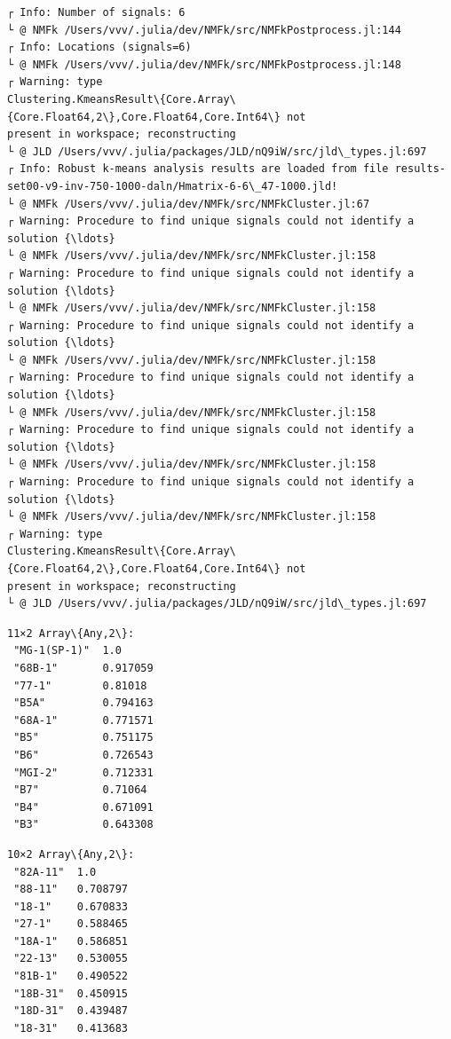 \documentclass[11pt]{article}
\begin{document}
    \begin{Verbatim}[commandchars=\\\{\}]
┌ Info: Number of signals: 6
└ @ NMFk /Users/vvv/.julia/dev/NMFk/src/NMFkPostprocess.jl:144
┌ Info: Locations (signals=6)
└ @ NMFk /Users/vvv/.julia/dev/NMFk/src/NMFkPostprocess.jl:148
┌ Warning: type
Clustering.KmeansResult\{Core.Array\{Core.Float64,2\},Core.Float64,Core.Int64\} not
present in workspace; reconstructing
└ @ JLD /Users/vvv/.julia/packages/JLD/nQ9iW/src/jld\_types.jl:697
┌ Info: Robust k-means analysis results are loaded from file results-
set00-v9-inv-750-1000-daln/Hmatrix-6-6\_47-1000.jld!
└ @ NMFk /Users/vvv/.julia/dev/NMFk/src/NMFkCluster.jl:67
┌ Warning: Procedure to find unique signals could not identify a solution {\ldots}
└ @ NMFk /Users/vvv/.julia/dev/NMFk/src/NMFkCluster.jl:158
┌ Warning: Procedure to find unique signals could not identify a solution {\ldots}
└ @ NMFk /Users/vvv/.julia/dev/NMFk/src/NMFkCluster.jl:158
┌ Warning: Procedure to find unique signals could not identify a solution {\ldots}
└ @ NMFk /Users/vvv/.julia/dev/NMFk/src/NMFkCluster.jl:158
┌ Warning: Procedure to find unique signals could not identify a solution {\ldots}
└ @ NMFk /Users/vvv/.julia/dev/NMFk/src/NMFkCluster.jl:158
┌ Warning: Procedure to find unique signals could not identify a solution {\ldots}
└ @ NMFk /Users/vvv/.julia/dev/NMFk/src/NMFkCluster.jl:158
┌ Warning: Procedure to find unique signals could not identify a solution {\ldots}
└ @ NMFk /Users/vvv/.julia/dev/NMFk/src/NMFkCluster.jl:158
┌ Warning: type
Clustering.KmeansResult\{Core.Array\{Core.Float64,2\},Core.Float64,Core.Int64\} not
present in workspace; reconstructing
└ @ JLD /Users/vvv/.julia/packages/JLD/nQ9iW/src/jld\_types.jl:697
    \end{Verbatim}


    \begin{Verbatim}[commandchars=\\\{\}]
11×2 Array\{Any,2\}:
 "MG-1(SP-1)"  1.0
 "68B-1"       0.917059
 "77-1"        0.81018
 "B5A"         0.794163
 "68A-1"       0.771571
 "B5"          0.751175
 "B6"          0.726543
 "MGI-2"       0.712331
 "B7"          0.71064
 "B4"          0.671091
 "B3"          0.643308
    \end{Verbatim}



    \begin{Verbatim}[commandchars=\\\{\}]
10×2 Array\{Any,2\}:
 "82A-11"  1.0
 "88-11"   0.708797
 "18-1"    0.670833
 "27-1"    0.588465
 "18A-1"   0.586851
 "22-13"   0.530055
 "81B-1"   0.490522
 "18B-31"  0.450915
 "18D-31"  0.439487
 "18-31"   0.413683
    \end{Verbatim}
\end{document}
